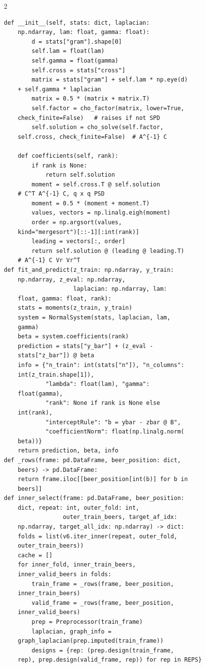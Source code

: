 \begin{multicols}{2}
\begin{Verbatim}[fontsize=\scriptsize]
    def __init__(self, stats: dict, laplacian:
    np.ndarray, lam: float, gamma: float):
        d = stats["gram"].shape[0]
        self.lam = float(lam)
        self.gamma = float(gamma)
        self.cross = stats["cross"]
        matrix = stats["gram"] + self.lam * np.eye(d)
    + self.gamma * laplacian
        matrix = 0.5 * (matrix + matrix.T)
        self.factor = cho_factor(matrix, lower=True,
    check_finite=False)   # raises if not SPD
        self.solution = cho_solve(self.factor,
    self.cross, check_finite=False)  # A^{-1} C

    def coefficients(self, rank):
        if rank is None:
            return self.solution
        moment = self.cross.T @ self.solution
    # C^T A^{-1} C, q x q PSD
        moment = 0.5 * (moment + moment.T)
        values, vectors = np.linalg.eigh(moment)
        order = np.argsort(values,
    kind="mergesort")[::-1][:int(rank)]
        leading = vectors[:, order]
        return self.solution @ (leading @ leading.T)
    # A^{-1} C Vr Vr^T
def fit_and_predict(z_train: np.ndarray, y_train:
    np.ndarray, z_eval: np.ndarray,
                    laplacian: np.ndarray, lam:
    float, gamma: float, rank):
    stats = moments(z_train, y_train)
    system = NormalSystem(stats, laplacian, lam,
    gamma)
    beta = system.coefficients(rank)
    prediction = stats["y_bar"] + (z_eval -
    stats["z_bar"]) @ beta
    info = {"n_train": int(stats["n"]), "n_columns":
    int(z_train.shape[1]),
            "lambda": float(lam), "gamma":
    float(gamma),
            "rank": None if rank is None else
    int(rank),
            "interceptRule": "b = ybar - zbar @ B",
            "coefficientNorm": float(np.linalg.norm(
    beta))}
    return prediction, beta, info
def _rows(frame: pd.DataFrame, beer_position: dict,
    beers) -> pd.DataFrame:
    return frame.iloc[[beer_position[int(b)] for b in
    beers]]
def inner_select(frame: pd.DataFrame, beer_position:
    dict, repeat: int, outer_fold: int,
                 outer_train_beers, target_af_idx:
    np.ndarray, target_all_idx: np.ndarray) -> dict:
    folds = list(v6.iter_inner(repeat, outer_fold,
    outer_train_beers))
    cache = []
    for inner_fold, inner_train_beers,
    inner_valid_beers in folds:
        train_frame = _rows(frame, beer_position,
    inner_train_beers)
        valid_frame = _rows(frame, beer_position,
    inner_valid_beers)
        prep = Preprocessor(train_frame)
        laplacian, graph_info =
    graph_laplacian(prep.imputed(train_frame))
        designs = {rep: (prep.design(train_frame,
    rep), prep.design(valid_frame, rep)) for rep in REPS}

\end{Verbatim}
\end{multicols}
